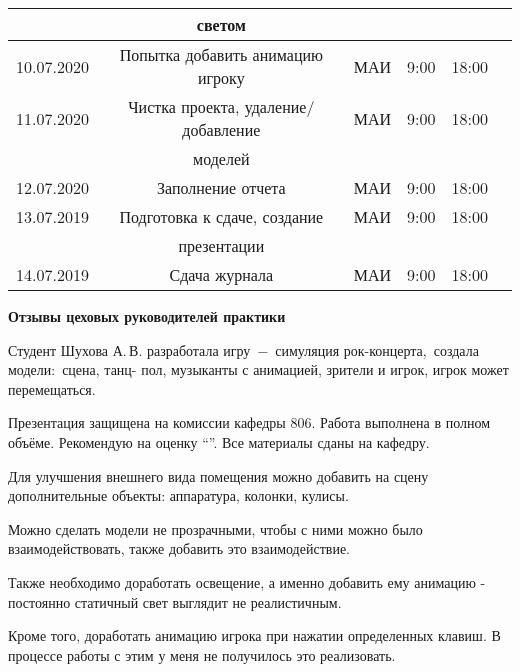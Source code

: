 \documentclass[dvipsnames,pdf, unicode, 12pt, a4paper, oneside, fleqn]{article}
\begin{document}
\begin{tabular}{|c|c|c|c|c|c|}
& светом & & & & \\
\hline
10.07.2020 & Попытка добавить анимацию игроку & МАИ & 9:00 & 18:00 & \\
\hline
11.07.2020 & Чистка проекта, удаление/добавление & МАИ & 9:00 & 18:00 & \\
& моделей & & & & \\
\hline
12.07.2020 & Заполнение отчета & МАИ & 9:00 & 18:00 & \\
\hline
13.07.2019 & Подготовка к сдаче, создание & МАИ & 9:00 & 18:00 & \\
& презентации & & & & \\
\hline
14.07.2019 & Сдача журнала & МАИ & 9:00 & 18:00 &  \\
\hline
\end{tabular}

\pagebreak

\begin{center}
\bfseries{\large Отзывы цеховых руководителей практики}
\end{center}
\begin{flushleft}


Студент Шухова А.\,В. разработала игру\, $-$\, симуляция рок-концерта,\, создала модели:\, сцена, танц- пол, музыканты с анимацией, зрители и игрок, игрок может перемещаться.

Презентация защищена на комиссии кафедры 806. Работа выполнена в полном объёме. Рекомендую на оценку \enquote{\hspace{2cm}}. Все материалы сданы на кафедру.
\pagebreak
\end{flushleft}


\begin{flushleft}
Для улучшения внешнего вида помещения можно добавить на сцену дополнительные объекты: аппаратура, колонки, кулисы.

Можно сделать модели не прозрачными, чтобы с ними можно было взаимодействовать, также добавить это взаимодействие. 

Также необходимо доработать освещение, а именно добавить ему анимацию - постоянно статичный свет выглядит не реалистичным.

Кроме того, доработать анимацию игрока при нажатии определенных клавиш. В процессе
работы с этим у меня не получилось это реализовать.

\end{flushleft}
\pagebreak
\end{document}

